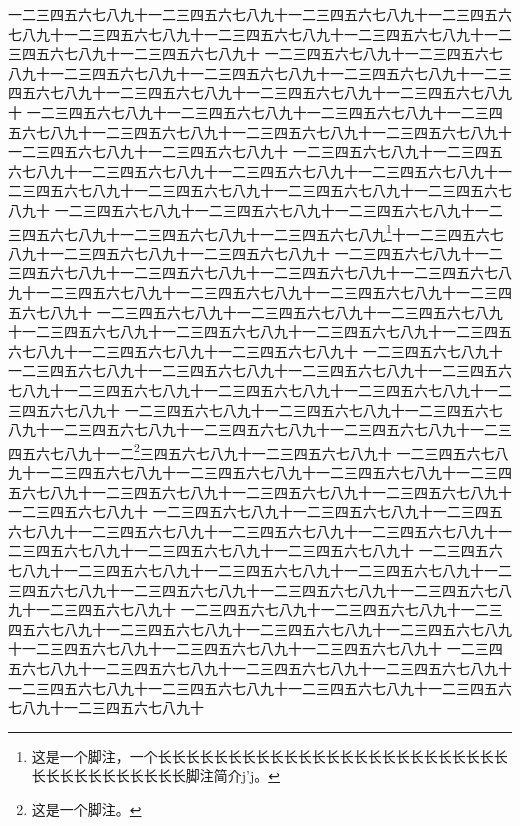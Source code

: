 \documentclass{scipub}
\begin{document}
一二三四五六七八九十一二三四五六七八九十一二三四五六七八九十一二三四五六七八九十一二三四五六七八九十一二三四五六七八九十一二三四五六七八九十一二三四五六七八九十一二三四五六七八九十
一二三四五六七八九十一二三四五六七八九十一二三四五六七八九十一二三四五六七八九十一二三四五六七八九十一二三四五六七八九十一二三四五六七八九十一二三四五六七八九十一二三四五六七八九十
一二三四五六七八九十一二三四五六七八九十一二三四五六七八九十一二三四五六七八九十一二三四五六七八九十一二三四五六七八九十一二三四五六七八九十一二三四五六七八九十一二三四五六七八九十
一二三四五六七八九十一二三四五六七八九十一二三四五六七八九十一二三四五六七八九十一二三四五六七八九十一二三四五六七八九十一二三四五六七八九十一二三四五六七八九十一二三四五六七八九十
一二三四五六七八九十一二三四五六七八九十一二三四五六七八九十一二三四五六七八九十一二三四五六七八九十一二三四五六七八九\footnote{这是一个脚注，一个长长长长长长长长长长长长长长长长长长长长长长长长长长长长长长长长长长长长脚注简介j'j。}十一二三四五六七八九十一二三四五六七八九十一二三四五六七八九十
一二三四五六七八九十一二三四五六七八九十一二三四五六七八九十一二三四五六七八九十一二三四五六七八九十一二三四五六七八九十一二三四五六七八九十一二三四五六七八九十一二三四五六七八九十
一二三四五六七八九十一二三四五六七八九十一二三四五六七八九十一二三四五六七八九十一二三四五六七八九十一二三四五六七八九十一二三四五六七八九十一二三四五六七八九十一二三四五六七八九十
一二三四五六七八九十一二三四五六七八九十一二三四五六七八九十一二三四五六七八九十一二三四五六七八九十一二三四五六七八九十一二三四五六七八九十一二三四五六七八九十一二三四五六七八九十
一二三四五六七八九十一二三四五六七八九十一二三四五六七八九十一二三四五六七八九十一二三四五六七八九十一二三四五六七八九十一二三四五六七八九十一二\footnote{这是一个脚注。}三四五六七八九十一二三四五六七八九十
一二三四五六七八九十一二三四五六七八九十一二三四五六七八九十一二三四五六七八九十一二三四五六七八九十一二三四五六七八九十一二三四五六七八九十一二三四五六七八九十一二三四五六七八九十
一二三四五六七八九十一二三四五六七八九十一二三四五六七八九十一二三四五六七八九十一二三四五六七八九十一二三四五六七八九十一二三四五六七八九十一二三四五六七八九十一二三四五六七八九十
一二三四五六七八九十一二三四五六七八九十一二三四五六七八九十一二三四五六七八九十一二三四五六七八九十一二三四五六七八九十一二三四五六七八九十一二三四五六七八九十一二三四五六七八九十
一二三四五六七八九十一二三四五六七八九十一二三四五六七八九十一二三四五六七八九十一二三四五六七八九十一二三四五六七八九十一二三四五六七八九十一二三四五六七八九十一二三四五六七八九十
一二三四五六七八九十一二三四五六七八九十一二三四五六七八九十一二三四五六七八九十一二三四五六七八九十一二三四五六七八九十一二三四五六七八九十一二三四五六七八九十一二三四五六七八九十
\end{document}
